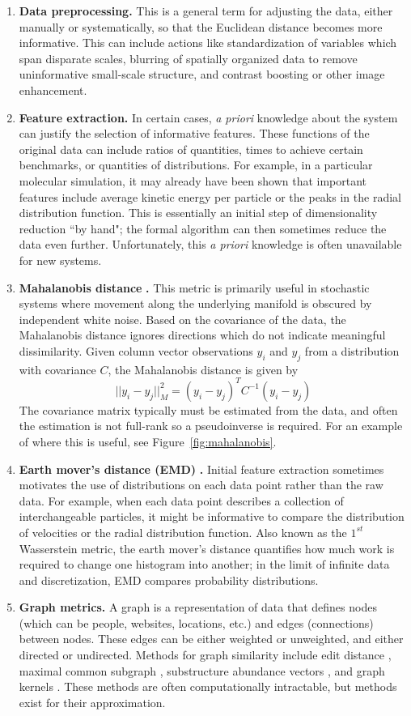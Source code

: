 \documentclass[12pt]{article}
\begin{document}
\begin{enumerate}
\item \textbf{Data preprocessing.}  This is a general term for adjusting the data, either manually or systematically, so that the Euclidean distance becomes more informative. This can include actions like standardization of variables which span disparate scales, blurring of spatially organized data to remove uninformative small-scale structure, and contrast boosting or other image enhancement.
\item \textbf{Feature extraction.} In certain cases, \textit{a priori} knowledge about the system can justify the selection of informative features. These functions of the original data can include ratios of quantities, times to achieve certain benchmarks, or quantities of distributions. For example, in a particular molecular simulation, it may already have been shown that important features include average kinetic energy per particle or the peaks in the radial distribution function. This is essentially an initial step of dimensionality reduction ``by hand"; the formal algorithm can then sometimes reduce the data even further. Unfortunately, this \textit{a priori} knowledge is often unavailable for new systems.
\item \textbf{Mahalanobis distance }\cite{Dsilva2015, Dsilva, Mahalanobis1936}\textbf{.}  This metric is primarily useful in stochastic systems where movement along the underlying manifold is obscured by independent white noise. Based on the covariance of the data, the Mahalanobis distance ignores directions which do not indicate meaningful dissimilarity. Given column vector observations $y_i$ and $y_j$ from a distribution with covariance $C$, the Mahalanobis distance is given by
\[
||y_i-y_j||^2_M = (y_i-y_j)^TC^{-1}(y_i-y_j)
\]
The covariance matrix typically must be estimated from the data, and often the estimation is not full-rank so a pseudoinverse is required. For an example of where this is useful, see Figure~\ref{fig:mahalanobis}.
\item \textbf{Earth mover's distance (EMD) }\cite{Levina2001}\textbf{.}   Initial feature extraction sometimes motivates the use of distributions on each data point rather than the raw data. For example, when each data point describes a collection of interchangeable particles, it might be informative to compare the distribution of velocities or the radial distribution function. Also known as the $1^{st}$ Wasserstein metric, the earth mover's distance quantifies how much work is required to change one histogram into another; in the limit of infinite data and discretization, EMD compares probability distributions.
\item \textbf{Graph metrics.} A graph is a representation of data that defines nodes (which can be people, websites, locations, etc.) and edges (connections) between nodes. These edges can be either weighted or unweighted, and either directed or undirected. Methods for graph similarity include edit distance \cite{Gao2010}, maximal common subgraph \cite{Bunke1998}, substructure abundance vectors \cite{Xiao2008}, and graph kernels \cite{Vishwanathan2010}. These methods are often computationally intractable, but methods exist for their approximation.
\end{enumerate}
\end{document}
